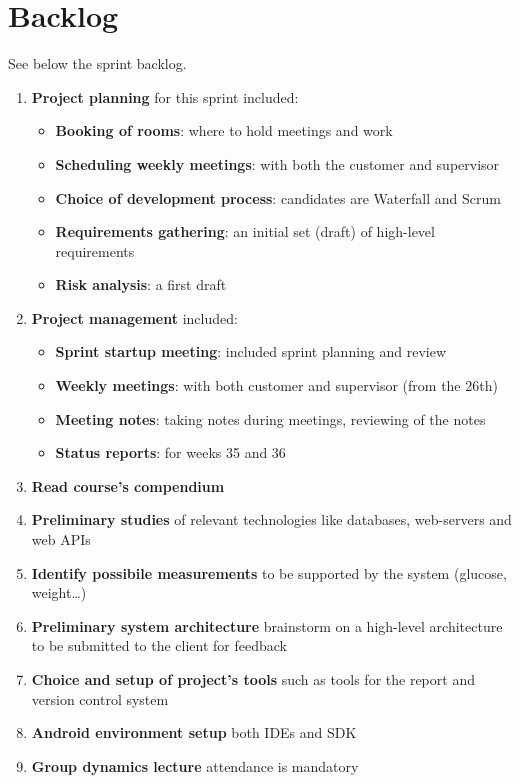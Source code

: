 \clearpage
\section{Backlog}

See below the sprint backlog.
\begin{enumerate}[1.]
	\item \textbf{Project planning} for this sprint included:
		\begin{itemize}
			\item \textbf{Booking of rooms}:
				where to hold meetings and work
			\item \textbf{Scheduling weekly meetings}:
				with both the customer and supervisor
			\item \textbf{Choice of development process}:
				candidates are Waterfall and Scrum
			\item \textbf{Requirements gathering}:
				an initial set (draft) of high-level requirements
			\item \textbf{Risk analysis}:
				a first draft
		\end{itemize}
	\item \textbf{Project management} included:
		\begin{itemize}
			\item \textbf{Sprint startup meeting}:
				included sprint planning and review
			\item \textbf{Weekly meetings}:
				with both customer and supervisor (from the 26th)
			\item \textbf{Meeting notes}:
				taking notes during meetings, reviewing of the notes
			\item \textbf{Status reports}:
				for weeks 35 and 36
		\end{itemize}
	\item \textbf{Read course's compendium}
	\item \textbf{Preliminary studies}\newline
		of relevant technologies like databases, web-servers and web APIs
	\item \textbf{Identify possibile measurements}\newline
		to be supported by the system (glucose, weight\ldots)
	\item \textbf{Preliminary system architecture}\newline
		brainstorm on a high-level architecture to be submitted to the client for feedback
	\item \textbf{Choice and setup of project's tools}\newline
		such as tools for the report and version control system
	\item \textbf{Android environment setup}\newline
		both IDEs and SDK
	\item \textbf{Group dynamics lecture}\newline
		attendance is mandatory
\end{enumerate}
